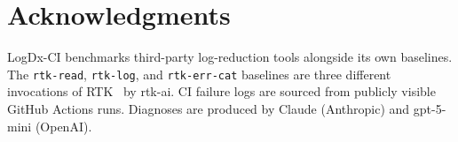 \documentclass{article}
\begin{document}
\section*{Acknowledgments}

LogDx-CI benchmarks third-party log-reduction tools alongside its
own baselines. The \texttt{rtk-read}, \texttt{rtk-log}, and
\texttt{rtk-err-cat} baselines are three different invocations of
RTK~\cite{rtk} by rtk-ai. CI failure logs are sourced from publicly
visible GitHub Actions runs. Diagnoses are produced by Claude
(Anthropic) and gpt-5-mini (OpenAI).



\end{document}
